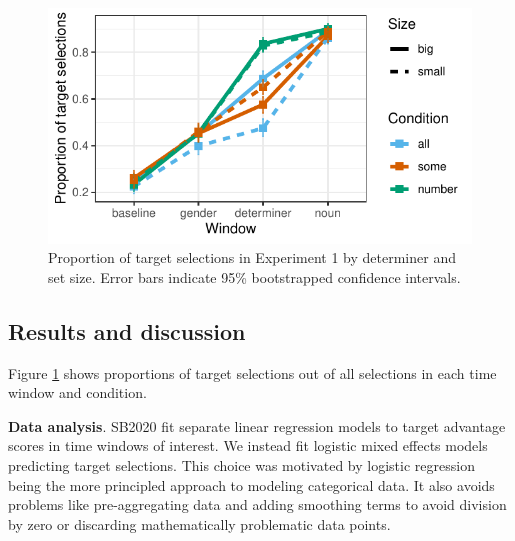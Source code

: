 \documentclass[10pt,letterpaper]{article}
\newcommand{\figref}[1]{Figure \ref{#1}}
\newcommand{\expref}[1]{Experiment #1}
\newcommand{\jd}[1]{\textcolor{Red}{\textbf{[jd: #1]}}}
\begin{document}
\begin{figure}[tbh!]
\centering
\includegraphics[width=\columnwidth]{../../analysis/SunBreheny/1_incremental/main/graphs/results-target-all-looks}
\caption{Proportion of target selections in \expref{1} by determiner and set size. Error bars indicate 95\% bootstrapped confidence intervals.} 
\label{fig:results-idt}
\end{figure}

\subsection{Results and discussion}


\figref{fig:results-idt} shows proportions of target selections out of all selections in each time window and condition. 


\textbf{Data analysis}. SB2020 fit separate linear regression models to target advantage scores in time windows of interest. We instead fit logistic mixed effects models predicting target selections. This choice was motivated by logistic regression being the more principled approach to modeling categorical data. It also avoids problems like pre-aggregating data and adding smoothing terms to avoid division by zero or discarding mathematically problematic data points. %
\end{document}
